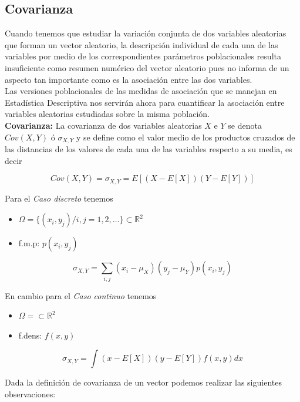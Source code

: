 \documentclass{article}
\begin{document}
\subsection{Covarianza}

Cuando tenemos que estudiar la variación conjunta de dos variables aleatorias que forman un vector aleatorio,
la descripción individual de cada una de las variables por medio de los correspondientes parámetros poblacionales
resulta insuficiente como resumen numérico del vector aleatorio pues no informa de un aspecto tan importante
como es la asociación entre las dos variables. \\
Las versiones poblacionales de las medidas de asociación que se manejan en Estadística Descriptiva nos servirán
ahora para cuantificar la asociación entre variables aleatorias estudiadas sobre la misma población. \\

\textbf{Covarianza:} La covarianza de dos variables aleatorias $X$ e $Y$ se denota $Cov(X, Y)$ ó $\sigma_{X,Y}$
y se define como el valor medio de los productos cruzados de las distancias de los valores de cada una de las
variables respecto a su media, es decir

\[ Cov(X, Y) = \sigma_{X, Y} = E[(X - E[X])(Y - E[Y])] \]

\newpage

Para el \textit{Caso discreto} tenemos
\begin{itemize}
    \item $\Omega = \{(x_i, y_j)/ i, j = 1, 2, \dots\} \subset \mathbb{R}^2$
    \item f.m.p: $p(x_i, y_j)$
\end{itemize}

\[ \sigma_{X, Y} = \displaystyle\sum_{i,j}(x_i - \mu_{X})(y_j - \mu_{Y})p(x_i, y_j) \]

En cambio para el \textit{Caso continuo} tenemos
\begin{itemize}
    \item $\Omega = \subset \mathbb{R}^2$
    \item f.dens: $f(x, y)$
\end{itemize}

\[ \sigma_{X, Y} = \int (x - E[X])(y - E[Y])f(x, y)dx \]

Dada la definición de covarianza de un vector podemos realizar las siguientes observaciones:
\end{document}
